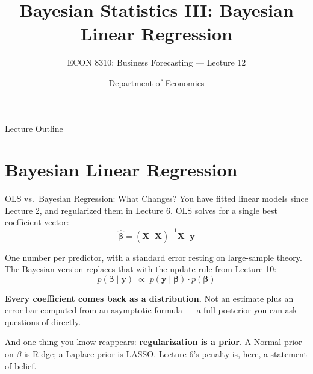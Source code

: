 \documentclass[aspectratio=169, 11pt]{beamer}
\title[Bayesian III: Regression]{Bayesian Statistics III: Bayesian Linear Regression}
\subtitle{ECON 8310: Business Forecasting --- Lecture 12}
\author{Department of Economics}
\institute{University of Nebraska at Omaha}
\begin{document}

\begin{frame}
  \titlepage
\end{frame}

\begin{frame}{Lecture Outline}
  \tableofcontents
\end{frame}

\section{Bayesian Linear Regression}


\begin{frame}{OLS vs.\ Bayesian Regression: What Changes?}
  You have fitted linear models since Lecture 2, and regularized them in Lecture 6. OLS solves
  for a single best coefficient vector:
  \[
    \hat{\boldsymbol{\beta}} = (\mathbf{X}^{\top}\mathbf{X})^{-1}\mathbf{X}^{\top}\mathbf{y}
  \]
  \vspace{-0.25cm}

  One number per predictor, with a standard error resting on large-sample theory. The Bayesian
  version replaces that with the update rule from Lecture 10:
  \[
    p(\boldsymbol{\beta} \mid \mathbf{y}) \;\propto\; p(\mathbf{y} \mid \boldsymbol{\beta}) \cdot p(\boldsymbol{\beta})
  \]
  \vspace{-0.25cm}

  \begin{keybox}
    \textbf{Every coefficient comes back as a distribution.} Not an estimate plus an error bar
    computed from an asymptotic formula --- a full posterior you can ask questions of directly.
  \end{keybox}

  And one thing you know reappears: \textbf{regularization is a prior}. A Normal prior on $\beta$
  is Ridge; a Laplace prior is LASSO. Lecture 6's penalty is, here, a statement of belief.
\end{frame}
\end{document}
